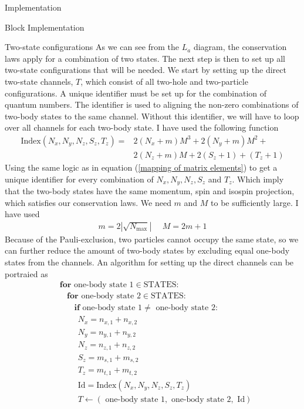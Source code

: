 \documentclass[twoside,english]{uiofysmaster}
\begin{document}
\begin{chapter}{Implementation}
\begin{section}{Block Implementation}
		\begin{subsection}{Two-state configurations}
			As we can see from the $L_a$ diagram, the conservation laws apply for a combination of two states. The next step is then to set up all two-state configurations that will be needed. We start by setting up the direct two-state channels, $T$, which consist of all two-hole and two-particle configurations. A unique identifier must be set up for the combination of quantum numbers. The identifier is used to aligning the non-zero combinations of two-body states to the same channel. Without this identifier, we will have to loop over all channels for each two-body state. I have used the following function 
			\begin{align}
				\text{Index}(N_x,N_y,N_z,S_z,T_z) = &2(N_x + m)M^3 + 2(N_y+m)M^2 + \\ & 2(N_z+m)M + 2(S_z+1) + (T_z+1)
			\end{align}
			Using the same logic as in equation (\ref{mapping of matrix elements}) to get a unique identifier for every combination of $N_x,N_y,N_z,S_z$ and $T_z$. Which imply that the two-body states have the same momentum, spin and isospin projection, which satisfies our conservation laws. We need $m$ and $M$ to be sufficiently large. I have used
			\begin{align}
				m = 2|\sqrt{N_{\text{max}}}| \:\:\:\:\:\: M = 2m +1
			\end{align}
			Because of the Pauli-exclusion, two particles cannot occupy the same state, so we can further reduce the amount of two-body states by excluding equal one-body states from the channels. An algorithm for setting up the direct channels can be portraied as
			\begin{align*}
				&\mathbf{for } \text{ one-body state 1} \in \text{STATES}: \\
				&\:\:\:\: \mathbf{for } \text{ one-body state 2} \in \text{STATES}: \\
				&\:\:\:\:\:\:\:\: \mathbf{if} \text{ one-body state 1} \neq \text{ one-body state 2}: \\
				&\:\:\:\:\:\:\:\:\:\: N_x = n_{x,1} + n_{x,2} \\
				&\:\:\:\:\:\:\:\:\:\: N_y = n_{y,1} + n_{y,2} \\
				&\:\:\:\:\:\:\:\:\:\: N_z = n_{z,1} + n_{z,2} \\
 				&\:\:\:\:\:\:\:\:\:\: S_z = m_{s,1} + m_{s,2} \\
				&\:\:\:\:\:\:\:\:\:\: T_z = m_{t,1} + m_{t,2} \\
				&\:\:\:\:\:\:\:\:\:\: \text{Id} = \text{Index}(N_x,N_y,N_z,S_z,T_z) \\
				&\:\:\:\:\:\:\:\:\:\: T \leftarrow (\text{ one-body state 1}, \text{ one-body state 2}, \text{ Id})
			\end{align*}


\end{subsection}
\end{section}
\end{chapter}
\end{document}
